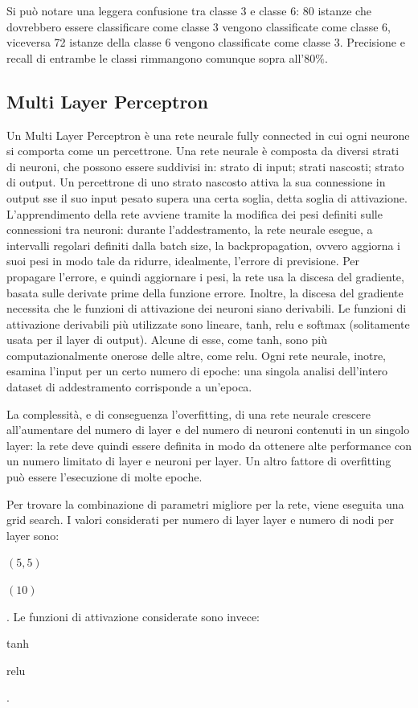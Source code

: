 Si può notare una leggera confusione tra classe 3 e classe 6: 80 istanze che 
dovrebbero essere classificare come classe 3 vengono classificate come classe 6,
viceversa 72 istanze della classe 6 vengono classificate come classe 3.
Precisione e recall di entrambe le classi rimmangono comunque sopra all'$80\%$.

\subsection{Multi Layer Perceptron}
Un Multi Layer Perceptron è una rete neurale fully connected in cui 
ogni neurone si comporta come un percettrone. Una rete neurale è composta
da diversi strati di neuroni, che possono essere suddivisi in: strato di input;
strati nascosti; strato di output.
Un percettrone di uno strato nascosto attiva la sua connessione in output
sse il suo input pesato supera una certa soglia, detta soglia di attivazione.
L'apprendimento della rete avviene tramite la modifica dei pesi definiti
sulle connessioni tra neuroni: durante l'addestramento, la rete neurale esegue,
a intervalli regolari definiti dalla batch size, la backpropagation, ovvero
aggiorna i suoi pesi in modo tale da ridurre, idealmente, l'errore di previsione.
Per propagare l'errore, e quindi aggiornare i pesi, la rete usa la discesa del
gradiente, basata sulle derivate prime della funzione errore. Inoltre,
la discesa del gradiente necessita che le funzioni di attivazione dei neuroni
siano derivabili.
Le funzioni di attivazione derivabili più utilizzate sono lineare, tanh, relu
e softmax (solitamente usata per il layer di output). Alcune di esse, come tanh,
sono più computazionalmente onerose delle altre, come relu.
Ogni rete neurale, inotre, esamina l'input per un certo numero di epoche:
una singola analisi dell'intero dataset di addestramento corrisponde a un'epoca.

La complessità, e di conseguenza l'overfitting, di una rete neurale crescere
all'aumentare del numero di layer e del numero di neuroni contenuti in un
singolo layer: la rete deve quindi
essere definita in modo da ottenere alte performance con un numero limitato
di layer e neuroni per layer.
Un altro fattore di overfitting può essere l'esecuzione di molte epoche.

Per trovare la combinazione di parametri migliore per la rete, viene eseguita 
una grid search. 
I valori considerati per numero di layer layer e numero di nodi per layer sono:
\begin{itemize*}
    \item $(5, 5)$
    \item $(10)$
\end{itemize*}.
Le funzioni di attivazione considerate sono invece: \begin{itemize*}
    \item tanh
    \item relu
\end{itemize*}.

